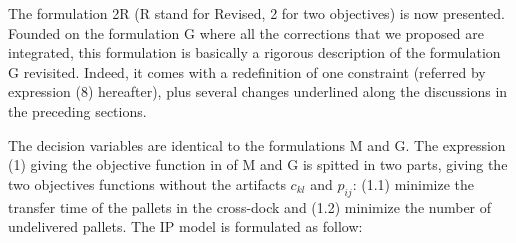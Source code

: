 \documentclass[preprint,12pt,authoryear]{elsarticle}
\begin{document}
The formulation 2R (R stand for Revised, 2 for two objectives) is now presented.
%
Founded on the formulation G where all the corrections that we proposed are integrated, this formulation is basically a rigorous description of the formulation G  revisited. Indeed, it comes with a redefinition of one constraint (referred by expression (8) hereafter), plus several changes underlined along the discussions in the preceding sections.

The decision variables are identical to the formulations M and G.
%
The expression (1) giving the objective function in of M and G is spitted in two parts, giving the two objectives functions without the artifacts $c_{kl}$ and $p_{ij}$:  (1.1) minimize the transfer time of the pallets in the cross-dock and (1.2) minimize the number of undelivered pallets. 
%
The IP model is formulated as follow: \\
\end{document}

